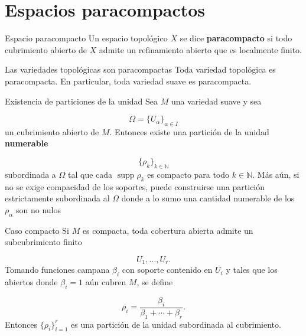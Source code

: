 \section{Espacios paracompactos}
\begin{bookdefinition}{Espacio paracompacto}
Un espacio topológico $X$ se dice \textbf{paracompacto} si todo cubrimiento abierto de $X$ admite un refinamiento abierto que es localmente finito.

\end{bookdefinition}
\begin{booktheorem}{Las variedades topológicas son paracompactas}
Toda variedad topológica es paracompacta. En particular, toda variedad suave es paracompacta.

\end{booktheorem}
\begin{booktheorem}{Existencia de particiones de la unidad}
Sea $M$ una variedad suave y sea

\[
\Omega=\{U_\alpha\}_{\alpha\in I}
\]
un cubrimiento abierto de $M$. Entonces existe una partición de la unidad \textbf{numerable}

\[
\{\rho_k\}_{k\in\mathbb N}
\]
subordinada a $\Omega$ tal que cada $\operatorname{supp}\rho_k$ es compacto para todo $k\in \mathbb{N}$. Más aún, si no se exige compacidad de los soportes, puede construirse una partición estrictamente subordinada al $\Omega$ donde a lo sumo una cantidad numerable de los $\rho_{\alpha }$ son no nulos

\end{booktheorem}
\label{blk:eafe2b}
\begin{bookexample}{Caso compacto}
Si $M$ es compacta, toda cobertura abierta admite un subcubrimiento finito

\[
U_1,\dots,U_r.
\]
Tomando funciones campana $\beta_i$ con soporte contenido en $U_i$ y tales que los abiertos donde $\beta_i=1$ aún cubren $M$, se define

\[
\rho_i=\frac{\beta_i}{\beta_1+\cdots+\beta_r}.
\]
Entonces $\{\rho_i\}_{i=1}^r$ es una partición de la unidad subordinada al cubrimiento.

\end{bookexample}
